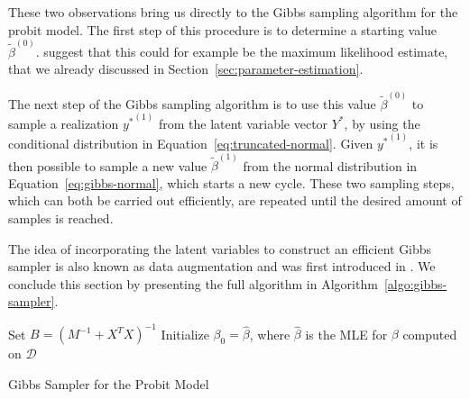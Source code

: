 These two observations bring us directly to the Gibbs sampling algorithm
for the probit model. The first step of this procedure is
to determine a starting value $\tilde\beta^{(0)}$.
\cite{gibbs-probit-albert-chib} suggest that this could for example
be the maximum likelihood estimate, that we already discussed in
Section~\ref{sec:parameter-estimation}.

The next step of the Gibbs sampling algorithm is to use this value
$\tilde\beta^{(0)}$ to sample a realization ${y^\ast}^{(1)}$ from the latent
variable vector $Y^\ast$, by using the conditional distribution
in Equation~\ref{eq:truncated-normal}. Given ${y^\ast}^{(1)}$,
it is then possible to sample a new value $\tilde\beta^{(1)}$ from
the normal distribution in Equation~\ref{eq:gibbs-normal},
which starts a new cycle. These two sampling steps, which can
both be carried out efficiently, are repeated until
the desired amount of samples is reached.

The idea of incorporating the latent variables to construct
an efficient Gibbs sampler is also known as data augmentation
and was first introduced in \cite{data-augmentation}.
We conclude this section by presenting the full algorithm
in Algorithm~\ref{algo:gibbs-sampler}.

\begin{algorithm}[t!]
    \DontPrintSemicolon
    Set $B = (M^{-1} + X^TX)^{-1}$ \;
    Initialize $\beta_0 = \hat\beta$, where $\hat\beta$ is the MLE for $\beta$
    computed on $\mathcal{D}$   \;
    \caption{Gibbs Sampler for the Probit Model\label{algo:gibbs-sampler}}
\end{algorithm}
